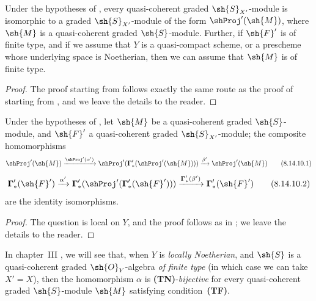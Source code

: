 \begin{corollary}[8.14.9]
\label{II.8.14.9}
Under the hypotheses of , every quasi-coherent graded $\sh{S}_{X'}$-module is isomorphic to a graded $\sh{S}_{X'}$-module of the form $\shProj'(\sh{M})$, where $\sh{M}$ is a quasi-coherent graded $\sh{S}$-module.
Further, if $\sh{F}'$ is of finite type, and if we assume that $Y$ is a quasi-compact scheme, or a prescheme whose underlying space is Noetherian, then we can assume that $\sh{M}$ is of finite type.
\end{corollary}

\begin{proof}
The proof starting from  follows exactly the same route as the proof of  starting from , and we leave the details to the reader.
\end{proof}

\begin{proposition}[8.14.10]
\label{II.8.14.10}
Under the hypotheses of , let $\sh{M}$ be a quasi-coherent graded $\sh{S}$-module, and $\sh{F}'$ a quasi-coherent graded $\sh{S}_{X'}$-module;
the composite homomorphisms
\[
\label{II.8.14.10.1}
    \shProj'(\sh{M})
    \xrightarrow{\shProj'(\alpha')}
    \shProj'(\boldsymbol{\Gamma}'_*(\shProj'(\sh{M})))
    \xrightarrow{\beta'}
    \shProj'(\sh{M})
\tag{8.14.10.1}
\]
\[
\label{II.8.14.10.2}
    \boldsymbol{\Gamma}'_*(\sh{F}')
    \xrightarrow{\alpha'}
    \boldsymbol{\Gamma}'_*(\shProj'(\boldsymbol{\Gamma}'_*(\sh{F}')))
    \xrightarrow{\boldsymbol{\Gamma}'_*(\beta')}
    \boldsymbol{\Gamma}'_*(\sh{F}')
\tag{8.14.10.2}
\]
are the identity isomorphisms.
\end{proposition}

\begin{proof}
The question is local on $Y$, and the proof follows as in ;
we leave the details to the reader.
\end{proof}

\begin{remark}[8.14.11]
\label{II.8.14.11}
In chapter~III , we will see that, when $Y$ is \emph{locally Noetherian}, and $\sh{S}$ is a quasi-coherent graded $\sh{O}_Y$-algebra \emph{of finite type} (in which case
we can take $X'=X$), then the homomorphism $\alpha$  is \textbf{(TN)}-\emph{bijective} for every quasi-coherent graded $\sh{S}$-module $\sh{M}$ satisfying condition~\textbf{(TF)}.
\end{remark}


